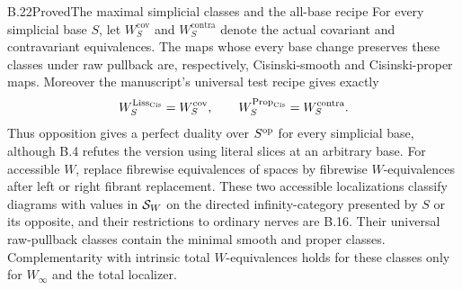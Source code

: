 \begin{claim}{B.22}{Proved}{The maximal simplicial classes and the all-base recipe}
For every simplicial base $S$, let $W^{\mathrm{cov}}_S$ and
$W^{\mathrm{contra}}_S$ denote the actual covariant and contravariant
equivalences. The maps whose every base change preserves these classes
under raw pullback are, respectively, Cisinski-smooth and Cisinski-proper
maps. Moreover the manuscript's universal test recipe gives exactly
\[
 W^{\mathrm{Liss}_{\mathrm{Cis}}}_S=W^{\mathrm{cov}}_S,
 \qquad W^{\mathrm{Prop}_{\mathrm{Cis}}}_S=W^{\mathrm{contra}}_S.
\]
Thus opposition gives a perfect duality over $S^{\mathrm{op}}$ for every simplicial
base, although B.4 refutes the version using literal slices at an arbitrary
base. For accessible $W$, replace fibrewise equivalences of spaces by
fibrewise $W$-equivalences after left or right fibrant replacement.
These two accessible localizations classify diagrams with values in
$\mathcal S_W$ on the directed infinity-category presented by $S$ or its
opposite, and their restrictions to ordinary nerves are B.16.
Their universal raw-pullback classes contain the minimal smooth and proper
classes. Complementarity with intrinsic total $W$-equivalences holds for
these classes only for $W_\infty$ and the total localizer.
\end{claim}
